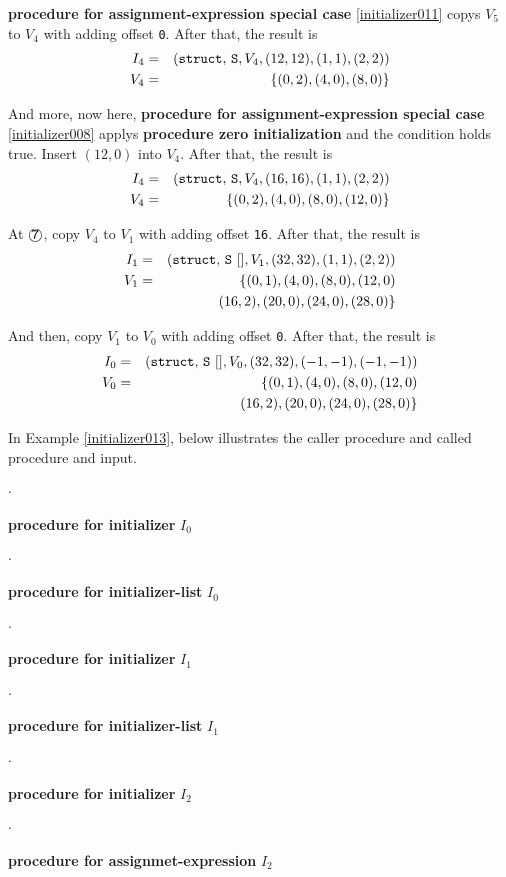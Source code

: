 \begin{Example}
{\bf procedure for assignment-expression special case} 
\ref{initializer011} copys $V_5$ to $V_4$ with adding offset {\tt{0}}.
After that, the result is
\begin{eqnarray*}
I_4 & = & ({\tt{struct,\,S}},V_4,(12,12),(1,1),(2,2)) \\
V_4 & = & \{(0,2), (4,0), (8,0) \}
\end{eqnarray*}

And more, now here,
{\bf procedure for assignment-expression special case} \ref{initializer008}
applys {\bf procedure zero initialization}
and the condition holds true. Insert $(12,0)$ into $V_4$.
After that, the result is
\begin{eqnarray*}
I_4 & = & ({\tt{struct,\,S}},V_4,(16,16),(1,1),(2,2)) \\
V_4 & = & \{(0,2), (4,0), (8,0), (12,0) \}
\end{eqnarray*}

\noindent
At $\MARU{\tt 7}$,
copy $V_4$ to $V_1$ with adding offset {\tt 16}.
After that, the result is
\begin{eqnarray*}
I_1 & = & ({\tt{struct,\,S\,\,[]}},V_1,(32,32),(1,1),(2,2)) \\
V_1 & = & \{(0,1), (4,0), (8,0), (12,0) \\
    &   &   (16,2), (20,0), (24,0), (28,0)  \}
\end{eqnarray*}

And then, copy $V_1$ to $V_0$ with adding offset {\tt{0}}.
After that, the result is
\begin{eqnarray*}
I_0 & = & ({\tt{struct,\,S\,\,[]}},V_0,(32,32),(-1,-1),(-1,-1)) \\
V_0 & = & \{(0,1), (4,0), (8,0), (12,0) \\
    &   &   (16,2), (20,0), (24,0), (28,0)  \}
\end{eqnarray*}

In Example \ref{initializer013}, below illustrates
the caller procedure and called procedure and input.

\begin{list}{$\cdot$}{}
\item {\bf procedure for initializer} $I_0$
    \begin{list}{$\cdot$}{}
    \item {\bf procedure for initializer-list} $I_0$
        \begin{list}{$\cdot$}{}
        \item {\bf procedure for initializer} $I_1$
            \begin{list}{$\cdot$}{}
            \item {\bf procedure for initializer-list} $I_1$
                \begin{list}{$\cdot$}{}
                \item {\bf procedure for initializer} $I_2$
                    \begin{list}{$\cdot$}{}
                    \item {\bf procedure for assignmet-expression} $I_2$


\end{list}
\end{list}
\end{list}
\end{list}
\end{list}
\end{list}
\end{Example}

